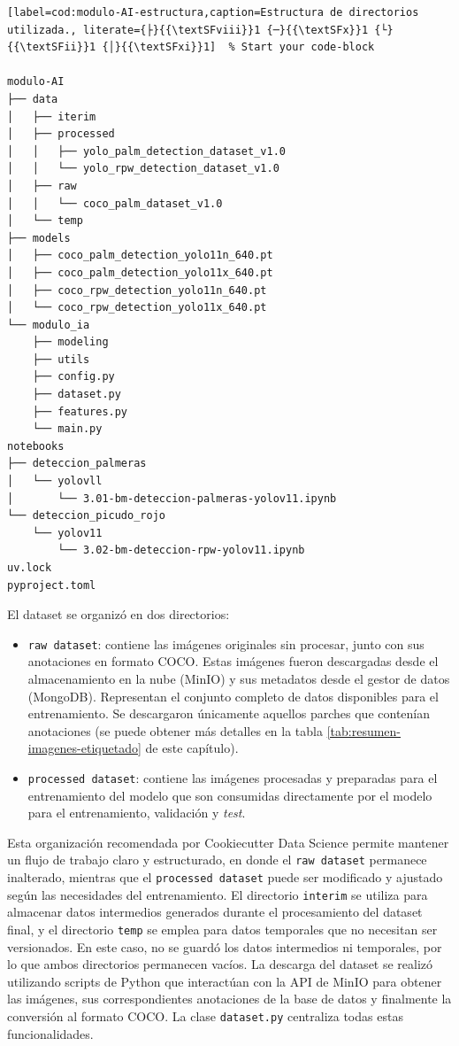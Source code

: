 \begin{lstlisting}[label=cod:modulo-AI-estructura,caption=Estructura de directorios utilizada., literate={├}{{\textSFviii}}1 {─}{{\textSFx}}1 {└}{{\textSFii}}1 {│}{{\textSFxi}}1]  % Start your code-block

modulo-AI
├── data
│   ├── iterim
│   ├── processed
│   │   ├── yolo_palm_detection_dataset_v1.0
│   │   └── yolo_rpw_detection_dataset_v1.0
│   ├── raw
│   │   └── coco_palm_dataset_v1.0
│   └── temp
├── models
│   ├── coco_palm_detection_yolo11n_640.pt
│   ├── coco_palm_detection_yolo11x_640.pt
│   ├── coco_rpw_detection_yolo11n_640.pt
│   └── coco_rpw_detection_yolo11x_640.pt
└── modulo_ia
    ├── modeling
    ├── utils
    ├── config.py
    ├── dataset.py
    ├── features.py
    └── main.py
notebooks
├── deteccion_palmeras
│   └── yolovll
│       └── 3.01-bm-deteccion-palmeras-yolov11.ipynb
└── deteccion_picudo_rojo
    └── yolov11
        └── 3.02-bm-deteccion-rpw-yolov11.ipynb
uv.lock
pyproject.toml

\end{lstlisting}

El dataset se organizó en dos directorios:
\begin{itemize}
  \item \texttt{raw dataset}: contiene las imágenes originales sin procesar, junto con sus anotaciones en formato COCO. Estas imágenes fueron descargadas desde el almacenamiento en la nube (MinIO) y sus metadatos desde el gestor de datos (MongoDB). Representan el conjunto completo de datos disponibles para el entrenamiento. Se descargaron únicamente aquellos parches que contenían anotaciones (se puede obtener más detalles en la tabla \ref{tab:resumen-imagenes-etiquetado} de este capítulo).
  \item \texttt{processed dataset}: contiene las imágenes procesadas y preparadas para el entrenamiento del modelo que son consumidas directamente por el modelo para el entrenamiento, validación y \textit{test}.
\end{itemize}

Esta organización recomendada por Cookiecutter Data Science permite mantener un flujo de trabajo claro y estructurado, en donde el \texttt{raw dataset} permanece inalterado, mientras que el \texttt{processed dataset} puede ser modificado y ajustado según las necesidades del entrenamiento. El directorio \texttt{interim} se utiliza para almacenar datos intermedios generados durante el procesamiento del dataset final, y el directorio \texttt{temp} se emplea para datos temporales que no necesitan ser versionados. En este caso, no se guardó los datos intermedios ni temporales, por lo que ambos directorios permanecen vacíos. La descarga del dataset se realizó utilizando scripts de Python que interactúan con la API de MinIO para obtener las imágenes, sus correspondientes anotaciones de la base de datos y finalmente la conversión al formato COCO. La clase \texttt{dataset.py} centraliza todas estas funcionalidades.


